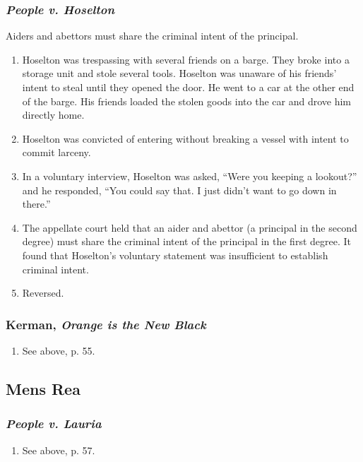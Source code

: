 \subsubsection{\emph{People v. Hoselton}}

Aiders and abettors must share the criminal intent of the principal.

\begin{enumerate}
    \item Hoselton was trespassing with several friends on a barge. They broke 
    into a storage unit and stole several tools. Hoselton was unaware of his 
    friends' intent to steal until they opened the door. He went to a car at 
    the other end of the barge. His friends loaded the stolen goods into the 
    car and drove him directly home.
    \item Hoselton was convicted of entering without breaking a vessel with 
    intent to commit larceny.
    \item In a voluntary interview, Hoselton was asked, ``Were you keeping a 
    lookout?'' and he responded, ``You could say that. I just didn't want to 
    go down in there.''
    \item The appellate court held that an aider and abettor (a principal in 
    the second degree) must share the criminal intent of the principal in the 
    first degree. It found that Hoselton's voluntary statement was 
    insufficient to establish criminal intent.
    \item Reversed.
\end{enumerate}

\subsubsection{Kerman, \emph{Orange is the New Black}}

\begin{enumerate}
    \item See above, p. 55.
\end{enumerate}

\subsection{Mens Rea}

\subsubsection{\emph{People v. Lauria}}

\begin{enumerate}
    \item See above, p. 57.
\end{enumerate}

